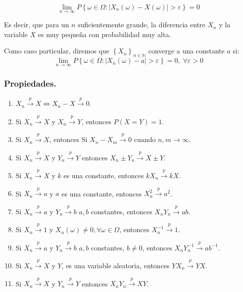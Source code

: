 \begin{equation}
\lim_{n\rightarrow\infty}P\left\{ \omega\in\Omega:\left|X_{n}(\omega)-X(\omega)\right|>\varepsilon\right\} =0
\end{equation}

Es decir, que para un $ n $ suficientemente grande, la diferencia entre $ X_n $ y la variable $ X $ es muy peque\~na con probabilidad muy alta.

Como caso particular, diremos que $ \left\{X_n\right\}_{n\in\mathbb{N}} $ converge a una constante $ a $ si:
\begin{equation}
\lim_{n\rightarrow\infty}P\left\{ \omega\in\Omega:\left|X_{n}(\omega)-a\right|>\varepsilon\right\} =0, \;\forall\varepsilon>0
\end{equation}

\subsubsection{Propiedades.}

\begin{enumerate}
\item $X_{n} \overset{p}{\to} X \Leftrightarrow X_{n}-X \overset{p}{\to} 0 $.
\item Si $X_{n} \overset{p}{\to} X $ y $X_{n} \overset{p}{\to} Y $, entonces $P\left(X=Y\right)=1$.
\item Si $X_{n} \overset{p}{\to} X $, entonces Si $X_{n}-X_{m} \overset{p}{\to} 0 $ cuando $n,m\to\infty$.
\item Si $X_{n} \overset{p}{\to} X $ y $Y_{n} \overset{p}{\to} Y $ entonces $X_{n}\pm Y_{n} \overset{p}{\to} X\pm Y $.
\item Si $X_{n} \overset{p}{\to} X $ y $k$ es una constante, entonces $kX_{n} \overset{p}{\to} kX $.
\item Si $X_{n} \overset{p}{\to} a $ y $a$ es una constante, entonces $X_{n}^2 \overset{p}{\to} a^2 $.
\item Si $X_{n} \overset{p}{\to} a $ y $Y_{n} \overset{p}{\to} b $  $a,b$ constantes, entonces $X_{n}Y_{n} \overset{p}{\to} ab $.
\item Si $X_{n} \overset{p}{\to} 1 $ y $X_{n}(\omega)\neq 0, \forall\omega\in\Omega$, entonces $X_{n}^{-1} \overset{p}{\to} 1 $.
\item Si $X_{n} \overset{p}{\to} a $ y $Y_{n} \overset{p}{\to} b $  $a,b$ constantes, $b\neq0$, entonces $X_{n}Y_{n}^{-1} \overset{p}{\to} ab^{-1} $.
\item Si $X_{n} \overset{p}{\to} X $ y $ Y $, es una variable aleatoria, entonces $YX_{n} \overset{p}{\to} YX $.
\item Si $X_{n} \overset{p}{\to} X $ y $Y_{n} \overset{p}{\to} Y $ entonces $X_{n}Y_{n} \overset{p}{\to} XY $.
\end{enumerate}

